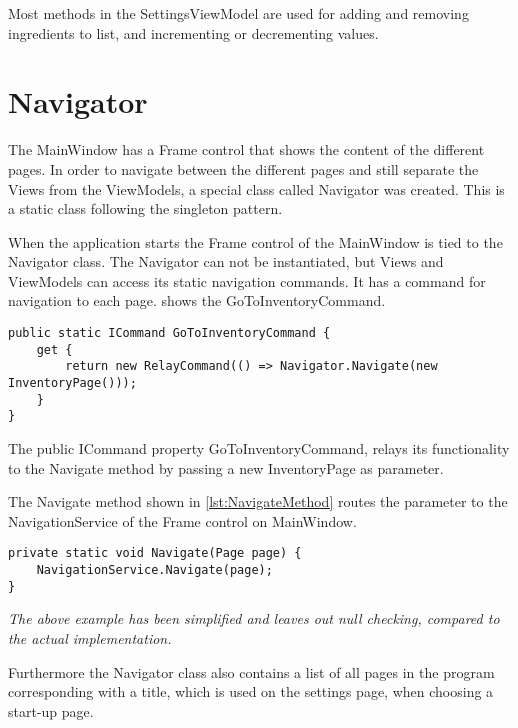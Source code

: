 Most methods in the SettingsViewModel are used for adding and removing ingredients to list, and incrementing or decrementing values.

\section{Navigator} \label{NavigatorLabel}
The MainWindow has a Frame control that shows the content of the different pages. In order to navigate between the different pages and still separate the Views from the ViewModels, a special class called Navigator was created. This is a static class following the singleton pattern. 

When the application starts the Frame control of the MainWindow is tied to the Navigator class.
The Navigator can not be instantiated, but Views and ViewModels can access its static navigation commands. It has a command for navigation to each page.  shows the GoToInventoryCommand.

\begin{lstlisting}[caption=GoToInventoryCommand, label={lst:InventoryCommand}, language=CSharp]
public static ICommand GoToInventoryCommand {
	get {
		return new RelayCommand(() => Navigator.Navigate(new InventoryPage()));
	}
}
\end{lstlisting}

The public ICommand property GoToInventoryCommand, relays its functionality to the Navigate method by passing a new InventoryPage as parameter.

The Navigate method shown in \cref{lst:NavigateMethod} routes the parameter to the NavigationService of the Frame control on MainWindow.

\begin{lstlisting}[caption=Navigate method, label={lst:NavigateMethod}, language=CSharp]
private static void Navigate(Page page) {
	NavigationService.Navigate(page);
}
\end{lstlisting}

\textit{The above example has been simplified and leaves out null checking, compared to the actual implementation.}

Furthermore the Navigator class also contains a list of all pages in the program corresponding with a title, which is used on the settings page, when choosing a start-up page.


